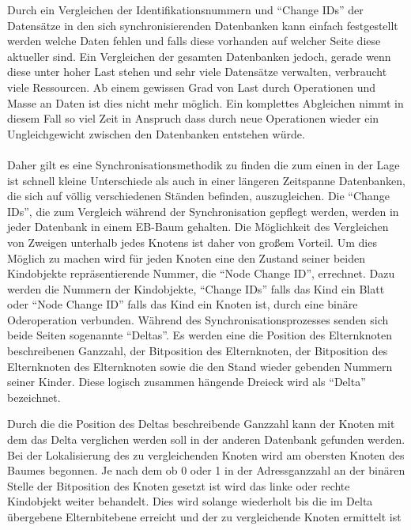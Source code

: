 \documentclass[a4paper,11pt,oneside,%
headsepline,												%
footsepline,												%
bibtotocnumbered									%
]{scrreprt}
\begin{document}
Durch ein Vergleichen der Identifikationsnummern und \enquote{Change IDs} der Datensätze in den sich synchronisierenden Datenbanken kann einfach festgestellt werden welche Daten fehlen und falls diese vorhanden auf welcher Seite diese aktueller sind. Ein Vergleichen der gesamten Datenbanken jedoch, gerade wenn diese unter hoher Last stehen und sehr viele Datensätze verwalten, verbraucht viele Ressourcen. Ab einem gewissen Grad von Last durch Operationen und Masse an Daten ist dies nicht mehr möglich. Ein komplettes Abgleichen nimmt in diesem Fall so viel Zeit in Anspruch dass durch neue Operationen wieder ein Ungleichgewicht zwischen den Datenbanken entstehen würde.\\\\
Daher gilt es eine Synchronisationsmethodik zu finden die zum einen in der Lage ist schnell kleine Unterschiede als auch in einer längeren Zeitspanne Datenbanken, die sich auf völlig verschiedenen Ständen befinden, auszugleichen.
Die \enquote{Change IDs}, die zum Vergleich während der Synchronisation gepflegt werden, werden in jeder Datenbank in einem \ac{EB-Baum} gehalten. Die Möglichkeit des Vergleichen von Zweigen unterhalb jedes Knotens ist daher von großem Vorteil. Um dies Möglich zu machen wird für jeden Knoten eine den Zustand seiner beiden Kindobjekte repräsentierende Nummer, die \enquote{Node Change ID}, errechnet. Dazu werden die Nummern der Kindobjekte, \enquote{Change IDs} falls das Kind ein Blatt oder \enquote{Node Change ID} falls das Kind ein Knoten ist, durch eine binäre Oderoperation verbunden. Während des Synchronisationsprozesses senden sich beide Seiten sogenannte \enquote{Deltas}. Es werden eine die Position des Elternknoten beschreibenen Ganzzahl, der Bitposition des  Elternknoten, der Bitposition des Elternknoten des Elternknoten  sowie die den Stand wieder gebenden Nummern seiner Kinder. Diese logisch zusammen hängende Dreieck wird als \enquote{Delta} bezeichnet. 

Durch die die Position des Deltas beschreibende Ganzzahl kann der Knoten mit dem das Delta verglichen werden soll in der anderen Datenbank gefunden werden. Bei der Lokalisierung des zu vergleichenden Knoten wird am obersten Knoten des Baumes begonnen. Je nach dem ob 0 oder 1 in der Adressganzzahl an der binären Stelle der Bitposition des Knoten  gesetzt ist wird das linke oder rechte Kindobjekt weiter behandelt. Dies wird solange wiederholt bis die im Delta übergebene Elternbitebene erreicht und der zu vergleichende Knoten ermittelt ist
\end{document}

